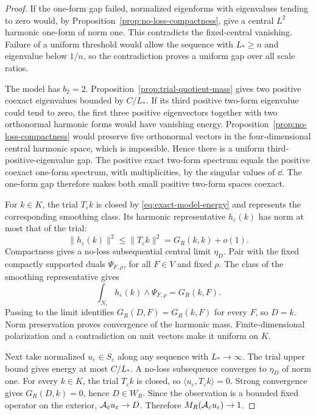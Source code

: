 \begin{proof}
If the one-form gap failed, normalized eigenforms with eigenvalues
tending to zero would, by Proposition~\ref{prop:no-loss-compactness},
give a central $L^2$ harmonic one-form of norm one. This contradicts
the fixed-central vanishing. Failure of a uniform threshold would
allow the sequence with $L_*\ge n$ and eigenvalue below $1/n$, so
the contradiction proves a uniform gap over all scale ratios.

The model has $b_2=2$. Proposition~\ref{prop:trial-quotient-mass}
gives two positive coexact eigenvalues bounded by $C/L_*$. If its
third positive two-form eigenvalue could tend to zero, the first
three positive eigenvectors together with two orthonormal harmonic
forms would have vanishing energy. Proposition~\ref{prop:no-loss-compactness}
would preserve five orthonormal vectors in the four-dimensional
central harmonic space, which is impossible. Hence there is a
uniform third-positive-eigenvalue gap. The positive exact two-form
spectrum equals the positive coexact one-form spectrum, with
multiplicities, by the singular values of $\dd$. The one-form gap
therefore makes both small positive two-form spaces coexact.

For $k\in K$, the trial $T_\varepsilon k$ is closed by
\eqref{eq:exact-model-energy} and represents the corresponding
smoothing class. Its harmonic representative $h_\varepsilon(k)$
has norm at most that of the trial:
\[
 \|h_\varepsilon(k)\|^2
       \le\|T_\varepsilon k\|^2=G_R(k,k)+o(1).
\]
Compactness gives a no-loss subsequential central limit $\eta_D$.
Pair with the fixed compactly supported duals
$\Psi_{F,\rho}$, for all $F\in V$ and fixed $\rho$. The class of
the smoothing representative gives
\[
 \int_{N_\varepsilon}h_\varepsilon(k)\wedge\Psi_{F,\rho}
       =G_R(k,F).
\]
Passing to the limit identifies $G_R(D,F)=G_R(k,F)$ for every $F$,
so $D=k$. Norm preservation proves convergence of the harmonic mass.
Finite-dimensional polarization and a contradiction on unit vectors
make it uniform on $K$.

Next take normalized $u_\varepsilon\in S_\varepsilon$ along any
sequence with $L_*\to\infty$. The trial upper bound gives energy
at most $C/L_*$. A no-loss subsequence converges to $\eta_D$ of
norm one. For every $k\in K$, the trial $T_\varepsilon k$ is closed,
so $\langle u_\varepsilon,T_\varepsilon k\rangle=0$. Strong
convergence gives $G_R(D,k)=0$, hence $D\in W_R$. Since the
observation is a bounded fixed operator on the exterior,
$\mathcal A_\varepsilon u_\varepsilon\to D$. Therefore
$M_R(\mathcal A_\varepsilon u_\varepsilon)\to1$.


\end{proof}
